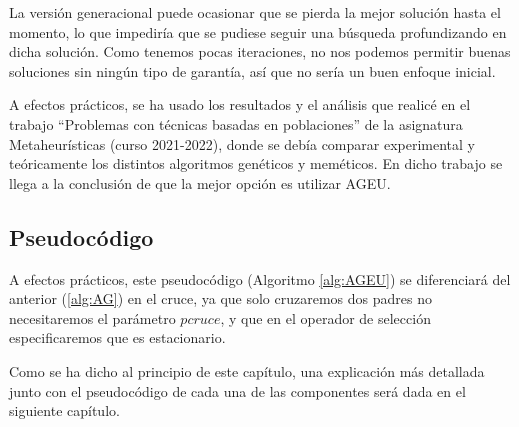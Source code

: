 La versión generacional puede ocasionar que se pierda la mejor solución hasta el momento, lo que impediría que se pudiese seguir una búsqueda profundizando en dicha solución. 
Como tenemos pocas iteraciones, no nos podemos permitir buenas soluciones sin ningún tipo de garantía, así que no sería un buen enfoque inicial. 


A efectos prácticos, se ha usado los resultados y el análisis que realicé en el trabajo ``Problemas con técnicas basadas en poblaciones'' de la asignatura Metaheurísticas (curso 2021-2022), donde se debía comparar experimental y teóricamente los distintos algoritmos genéticos y meméticos. 
En dicho trabajo se llega a la conclusión de que la mejor opción es utilizar AGEU.

\subsection{Pseudocódigo}

A efectos prácticos, este pseudocódigo (Algoritmo \ref{alg:AGEU}) se diferenciará del anterior (\ref{alg:AG}) en el cruce, ya que solo cruzaremos dos padres no necesitaremos el parámetro $pcruce$, y que en el operador de selección especificaremos que es estacionario. 

Como se ha dicho al principio de este capítulo, una explicación más detallada junto con el pseudocódigo de cada una de las componentes será dada en el siguiente capítulo.

